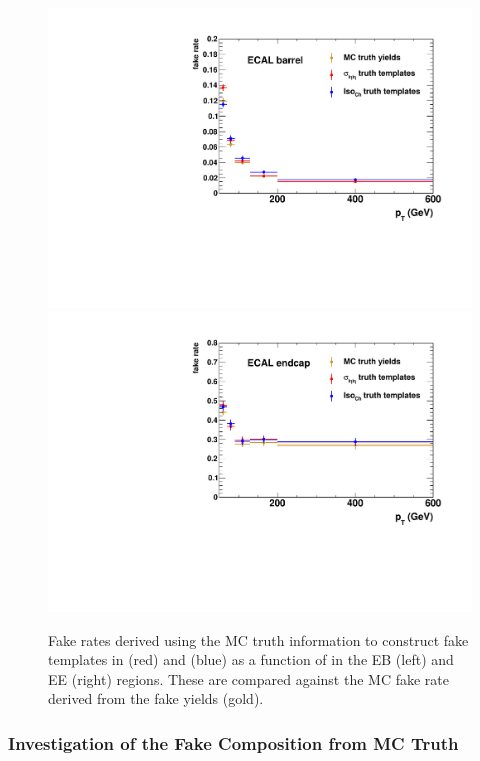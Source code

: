 \begin{figure}[!htbp]
  \centering
  \includegraphics[scale=0.40]{figures/closure_test_fake_rates_truth_EB.pdf}
  \includegraphics[scale=0.40]{figures/closure_test_fake_rates_truth_EE.pdf}
  \caption{Fake rates derived using the MC truth information to construct fake templates in \sieie (red) and \chiso (blue) as a function of \pt in the EB (left) and EE (right) regions. These are compared against the MC fake rate derived from the fake yields (gold).}
  \label{fig:truth_fake_rate_comparisons}
\end{figure}


\subsubsection{Investigation of the Fake Composition from MC Truth}

